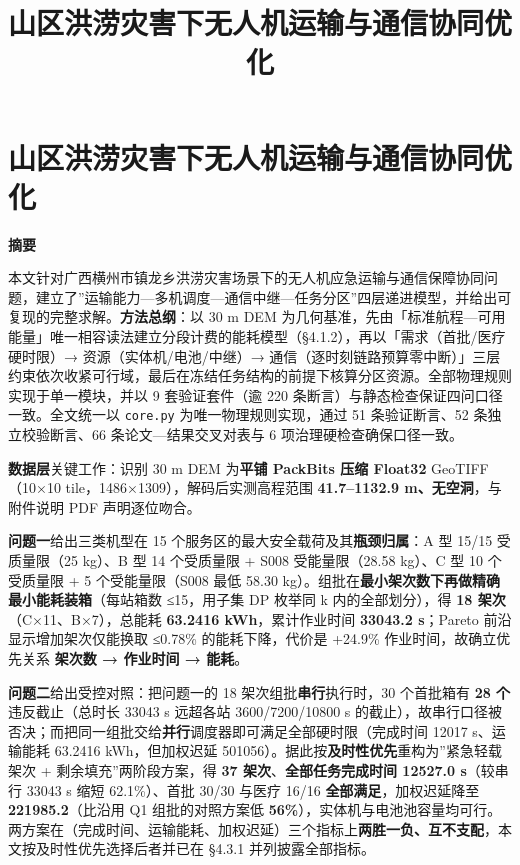 \documentclass[
  10.5pt,
]{extarticle}
\title{山区洪涝灾害下无人机运输与通信协同优化}
\author{}
\date{}
\begin{document}
\maketitle

\section{山区洪涝灾害下无人机运输与通信协同优化}\label{ux5c71ux533aux6d2aux6d9dux707eux5bb3ux4e0bux65e0ux4ebaux673aux8fd0ux8f93ux4e0eux901aux4fe1ux534fux540cux4f18ux5316}

\textbf{摘要}

本文针对广西横州市镇龙乡洪涝灾害场景下的无人机应急运输与通信保障协同问题，建立了''运输能力---多机调度---通信中继---任务分区''四层递进模型，并给出可复现的完整求解。\textbf{方法总纲}：以
30 m DEM
为几何基准，先由「标准航程---可用能量」唯一相容读法建立分段计费的能耗模型（§4.1.2），再以「需求（首批/医疗硬时限）→
资源（实体机/电池/中继）→
通信（逐时刻链路预算零中断）」三层约束依次收紧可行域，最后在冻结任务结构的前提下核算分区资源。全部物理规则实现于单一模块，并以
9 套验证套件（逾 220 条断言）与静态检查保证四问口径一致。全文统一以
\texttt{core.py} 为唯一物理规则实现，通过 51 条验证断言、52
条独立校验断言、66 条论文---结果交叉对表与 6 项治理硬检查确保口径一致。

\textbf{数据层}关键工作：识别 30 m DEM 为\textbf{平铺 PackBits 压缩
Float32} GeoTIFF（10×10 tile，1486×1309），解码后实测高程范围
\textbf{41.7--1132.9 m、无空洞}，与附件说明 PDF 声明逐位吻合。

\textbf{问题一}给出三类机型在 15
个服务区的最大安全载荷及其\textbf{瓶颈归属}：A 型 15/15 受质量限（25
kg）、B 型 14 个受质量限 + S008 受能量限（28.58 kg）、C 型 10 个受质量限
+ 5 个受能量限（S008 最低 58.30
kg）。组批在\textbf{最小架次数下再做精确最小能耗装箱}（每站箱数
≤15，用子集 DP 枚举同 k 内的全部划分），得 \textbf{18
架次}（C×11、B×7），总能耗 \textbf{63.2416 kWh}，累计作业时间
\textbf{33043.2 s}；Pareto 前沿显示增加架次仅能换取 ≤0.78\%
的能耗下降，代价是 +24.9\% 作业时间，故确立优先关系 \textbf{架次数 →
作业时间 → 能耗}。

\textbf{问题二}给出受控对照：把问题一的 18
架次组批\textbf{串行}执行时，30 个首批箱有 \textbf{28
个}违反截止（总时长 33043 s 远超各站 3600/7200/10800 s
的截止），故串行口径被否决；而把同一组批交给\textbf{并行}调度器即可满足全部硬时限（完成时间
12017 s、运输能耗 63.2416 kWh，但加权迟延
501056）。据此按\textbf{及时性优先}重构为''紧急轻载架次 +
剩余填充''两阶段方案，得 \textbf{37 架次}、\textbf{全部任务完成时间
12527.0 s}（较串行 33043 s 缩短 62.1\%）、首批 30/30 与医疗 16/16
\textbf{全部满足}，加权迟延降至 \textbf{221985.2}（比沿用 Q1
组批的对照方案低
\textbf{56\%}），实体机与电池池容量均可行。两方案在（完成时间、运输能耗、加权迟延）三个指标上\textbf{两胜一负、互不支配}，本文按及时性优先选择后者并已在
§4.3.1 并列披露全部指标。
\end{document}
